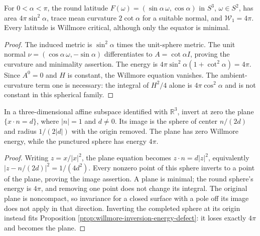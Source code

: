 \begin{example}\label{ex:latitude-willmore-energy}
For $0<\alpha<\pi$, the round latitude $F(\omega)=(\sin\alpha\,\omega,\cos\alpha)$ in $S^3$, $\omega\in S^2$, has area $4\pi\sin^2\alpha$, trace mean curvature $2\cot\alpha$ for a suitable normal, and $\mathcal W_1=4\pi$. Every latitude is Willmore critical, although only the equator is minimal.
\end{example}
\begin{proof}
The induced metric is $\sin^2\alpha$ times the unit-sphere metric. The unit normal $\nu=(\cos\alpha\,\omega,-\sin\alpha)$ differentiates to $A=\cot\alpha I$, proving the curvature and minimality assertion. The energy is $4\pi\sin^2\alpha(1+\cot^2\alpha)=4\pi$. Since $A^0=0$ and $H$ is constant, the Willmore equation vanishes. The ambient-curvature term one is necessary: the integral of $H^2/4$ alone is $4\pi\cos^2\alpha$ and is not constant in this spherical family.
\end{proof}

\begin{example}\label{ex:inversion-affine-plane-sphere}
In a three-dimensional affine subspace identified with $\mathbb R^3$, invert at zero the plane $\{x\cdot n=d\}$, where $|n|=1$ and $d\ne0$. Its image is the sphere of center $n/(2d)$ and radius $1/(2|d|)$ with the origin removed. The plane has zero Willmore energy, while the punctured sphere has energy $4\pi$.
\end{example}
\begin{proof}
Writing $z=x/|x|^2$, the plane equation becomes $z\cdot n=d|z|^2$, equivalently
$|z-n/(2d)|^2=1/(4d^2)$. Every nonzero point of this sphere inverts to a point of the plane, proving the image assertion. A plane is minimal; the round sphere's energy is $4\pi$, and removing one point does not change its integral. The original plane is noncompact, so invariance for a closed surface with a pole off its image does not apply in that direction. Inverting the completed sphere at its origin instead fits Proposition \ref{prop:willmore-inversion-energy-defect}: it loses exactly $4\pi$ and becomes the plane.
\end{proof}

